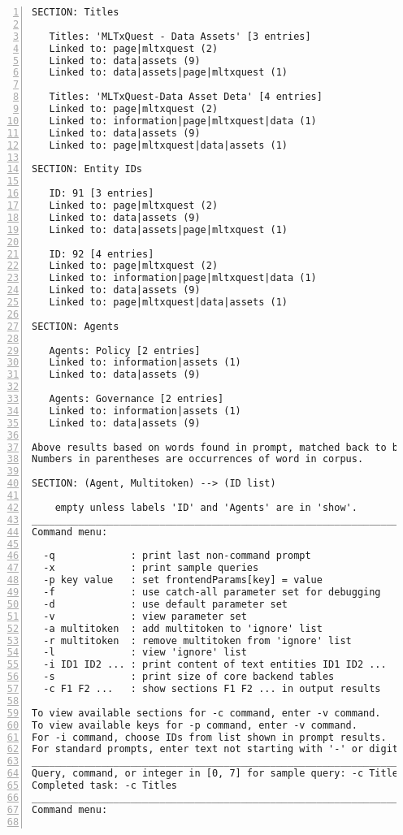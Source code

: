 \documentclass[10pt]{article}
\begin{document}
{\begin{lstlisting}[numbers=left,basicstyle=\ttfamily\footnotesize, frame=none]
SECTION: Titles

   Titles: 'MLTxQuest - Data Assets' [3 entries]
   Linked to: page|mltxquest (2)
   Linked to: data|assets (9)
   Linked to: data|assets|page|mltxquest (1)

   Titles: 'MLTxQuest-Data Asset Deta' [4 entries]
   Linked to: page|mltxquest (2)
   Linked to: information|page|mltxquest|data (1)
   Linked to: data|assets (9)
   Linked to: page|mltxquest|data|assets (1)

SECTION: Entity IDs

   ID: 91 [3 entries]
   Linked to: page|mltxquest (2)
   Linked to: data|assets (9)
   Linked to: data|assets|page|mltxquest (1)

   ID: 92 [4 entries]
   Linked to: page|mltxquest (2)
   Linked to: information|page|mltxquest|data (1)
   Linked to: data|assets (9)
   Linked to: page|mltxquest|data|assets (1)

SECTION: Agents

   Agents: Policy [2 entries]
   Linked to: information|assets (1)
   Linked to: data|assets (9)

   Agents: Governance [2 entries]
   Linked to: information|assets (1)
   Linked to: data|assets (9)

Above results based on words found in prompt, matched back to backend tables.
Numbers in parentheses are occurrences of word in corpus.

SECTION: (Agent, Multitoken) --> (ID list)

    empty unless labels 'ID' and 'Agents' are in 'show'.
____________________________________________________________________
Command menu:

  -q             : print last non-command prompt
  -x             : print sample queries
  -p key value   : set frontendParams[key] = value
  -f             : use catch-all parameter set for debugging
  -d             : use default parameter set
  -v             : view parameter set
  -a multitoken  : add multitoken to 'ignore' list
  -r multitoken  : remove multitoken from 'ignore' list
  -l             : view 'ignore' list
  -i ID1 ID2 ... : print content of text entities ID1 ID2 ...
  -s             : print size of core backend tables
  -c F1 F2 ...   : show sections F1 F2 ... in output results

To view available sections for -c command, enter -v command.
To view available keys for -p command, enter -v command.
For -i command, choose IDs from list shown in prompt results.
For standard prompts, enter text not starting with '-' or digit.
____________________________________________________________________
Query, command, or integer in [0, 7] for sample query: -c Titles
Completed task: -c Titles
____________________________________________________________________
Command menu:


\end{lstlisting}}
\end{document}

